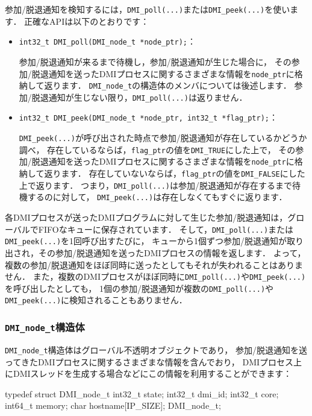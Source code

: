 \documentclass[report,12pt]{jsbook}
\begin{document}
参加/脱退通知を検知するには，\texttt{DMI\_poll(...)}または\texttt{DMI\_peek(...)}を使います．
正確なAPIは以下のとおりです：
\begin{itemize}
\item \texttt{int32\_t DMI\_poll(DMI\_node\_t *node\_ptr);}：
  
  参加/脱退通知が来るまで待機し，参加/脱退通知が生じた場合に，
  その参加/脱退通知を送ったDMIプロセスに関するさまざまな情報を\texttt{node\_ptr}に格納して返ります．
  \texttt{DMI\_node\_t}の構造体のメンバについては後述します．
  参加/脱退通知が生じない限り，\texttt{DMI\_poll(...)}は返りません．
\item \texttt{int32\_t DMI\_peek(DMI\_node\_t *node\_ptr, int32\_t *flag\_ptr);}：
  
  \texttt{DMI\_peek(...)}が呼び出された時点で参加/脱退通知が存在しているかどうか調べ，
  存在しているならば，\texttt{flag\_ptr}の値を\texttt{DMI\_TRUE}にした上で，
  その参加/脱退通知を送ったDMIプロセスに関するさまざまな情報を\texttt{node\_ptr}に格納して返ります．
  存在していないならば，\texttt{flag\_ptr}の値を\texttt{DMI\_FALSE}にした上で返ります．
  つまり，\texttt{DMI\_poll(...)}は参加/脱退通知が存在するまで待機するのに対して，
  \texttt{DMI\_peek(...)}は存在しなくてもすぐに返ります．
\end{itemize}

各DMIプロセスが送ったDMIプログラムに対して生じた参加/脱退通知は，グローバルでFIFOなキューに保存されています．
そして，\texttt{DMI\_poll(...)}または\texttt{DMI\_peek(...)}を1回呼び出すたびに，
キューから1個ずつ参加/脱退通知が取り出され，その参加/脱退通知を送ったDMIプロセスの情報を返します．
よって，複数の参加/脱退通知をほぼ同時に送ったとしてもそれが失われることはありません．
また，複数のDMIプロセスがほぼ同時に\texttt{DMI\_poll(...)}や\texttt{DMI\_peek(...)}を呼び出したとしても，
1個の参加/脱退通知が複数の\texttt{DMI\_poll(...)}や\texttt{DMI\_peek(...)}に検知されることもありません．

\subsubsection{\texttt{DMI\_node\_t}構造体}

\texttt{DMI\_node\_t}構造体はグローバル不透明オブジェクトであり，
参加/脱退通知を送ってきたDMIプロセスに関するさまざまな情報を含んでおり，
DMIプロセス上にDMIスレッドを生成する場合などにこの情報を利用することができます：

\begin{code}
typedef struct DMI_node_t
{
  int32_t state;
  int32_t dmi_id;
  int32_t core;
  int64_t memory;
  char hostname[IP_SIZE];
}DMI_node_t;
\end{code}
\end{document}
